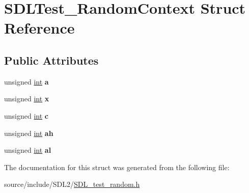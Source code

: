 \hypertarget{struct_s_d_l_test___random_context}{}\section{S\+D\+L\+Test\+\_\+\+Random\+Context Struct Reference}
\label{struct_s_d_l_test___random_context}
\subsection*{Public Attributes}
\begin{DoxyCompactItemize}
\item 
\hypertarget{struct_s_d_l_test___random_context_a24f830d6cb476c96fbe325c99331e45f}{}unsigned \hyperlink{_s_d_l__thread_8h_a6a64f9be4433e4de6e2f2f548cf3c08e}{int} {\bfseries a}\label{struct_s_d_l_test___random_context_a24f830d6cb476c96fbe325c99331e45f}

\item 
\hypertarget{struct_s_d_l_test___random_context_a8bd6d1b4e1677ed1c06f5cc09f1af5b6}{}unsigned \hyperlink{_s_d_l__thread_8h_a6a64f9be4433e4de6e2f2f548cf3c08e}{int} {\bfseries x}\label{struct_s_d_l_test___random_context_a8bd6d1b4e1677ed1c06f5cc09f1af5b6}

\item 
\hypertarget{struct_s_d_l_test___random_context_a17a6a7e7b68a33c67d9b74c8c7c33198}{}unsigned \hyperlink{_s_d_l__thread_8h_a6a64f9be4433e4de6e2f2f548cf3c08e}{int} {\bfseries c}\label{struct_s_d_l_test___random_context_a17a6a7e7b68a33c67d9b74c8c7c33198}

\item 
\hypertarget{struct_s_d_l_test___random_context_a2c8d2f1ee16cdfd38361b8f03b3fdb85}{}unsigned \hyperlink{_s_d_l__thread_8h_a6a64f9be4433e4de6e2f2f548cf3c08e}{int} {\bfseries ah}\label{struct_s_d_l_test___random_context_a2c8d2f1ee16cdfd38361b8f03b3fdb85}

\item 
\hypertarget{struct_s_d_l_test___random_context_a0e2bccd3611d383d6510c6c828aa54c4}{}unsigned \hyperlink{_s_d_l__thread_8h_a6a64f9be4433e4de6e2f2f548cf3c08e}{int} {\bfseries al}\label{struct_s_d_l_test___random_context_a0e2bccd3611d383d6510c6c828aa54c4}

\end{DoxyCompactItemize}


The documentation for this struct was generated from the following file\+:\begin{DoxyCompactItemize}
\item 
source/include/\+S\+D\+L2/\hyperlink{_s_d_l__test__random_8h}{S\+D\+L\+\_\+test\+\_\+random.\+h}\end{DoxyCompactItemize}

